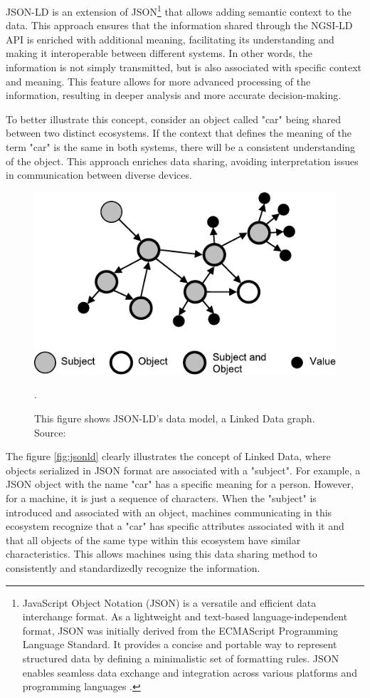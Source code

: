 JSON-LD is an extension of JSON\footnote{JavaScript Object Notation (JSON) is a versatile and efficient data interchange format. As a lightweight and text-based language-independent format, JSON was initially derived from the ECMAScript Programming Language Standard. It provides a concise and portable way to represent structured data by defining a minimalistic set of formatting rules. JSON enables seamless data exchange and integration across various platforms and programming languages \cite{rfc7159,pezoa}.} that allows adding semantic context to the data. This approach ensures that the information shared through the NGSI-LD API is enriched with additional meaning, facilitating its understanding and making it interoperable between different systems. In other words, the information is not simply transmitted, but is also associated with specific context and meaning. This feature allows for more advanced processing of the information, resulting in deeper analysis and more accurate decision-making.

To better illustrate this concept, consider an object called "car" being shared between two distinct ecosystems. If the context that defines the meaning of the term "car" is the same in both systems, there will be a consistent understanding of the object. This approach enriches data sharing, avoiding interpretation issues in communication between diverse devices.

\begin{figure}[ht!]
    \centering
    \includegraphics[width=.65\linewidth]{images/Development/chap4/jsonld.pdf} 
    \caption{This figure shows JSON-LD’s data model, a Linked Data graph. Source: \cite{Lanthaler2012}}.
    \label{fig: jsonld}
\end{figure}

The figure \ref{fig:jsonld} clearly illustrates the concept of Linked Data, where objects serialized in JSON format are associated with a "subject". For example, a JSON object with the name "car" has a specific meaning for a person. However, for a machine, it is just a sequence of characters. When the "subject" is introduced and associated with an object, machines communicating in this ecosystem recognize that a "car" has specific attributes associated with it and that all objects of the same type within this ecosystem have similar characteristics. This allows machines using this data sharing method to consistently and standardizedly recognize the information.

